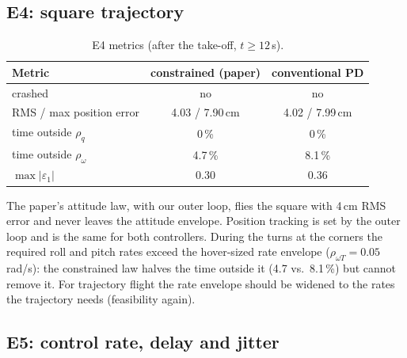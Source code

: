 \subsection{E4: square trajectory}


\begin{table}[H]
\centering\small
\caption{E4 metrics (after the take-off, $t\ge12$\,s).}
\label{tab:e4}
\begin{tabular}{@{}lcc@{}}
\toprule
\textbf{Metric} & \textbf{constrained (paper)} & \textbf{conventional PD}\\
\midrule
crashed & no & no\\
RMS / max position error & 4.03 / 7.90\,cm & 4.02 / 7.99\,cm\\
time outside $\rho_q$ & 0\,\% & 0\,\%\\
time outside $\rho_\omega$ & 4.7\,\% & 8.1\,\%\\
$\max|\varepsilon_1|$ & 0.30 & 0.36\\
\bottomrule
\end{tabular}
\end{table}

\begin{projbox}[conclusion of E4]
The paper's attitude law, with our outer loop, flies the square with 4\,cm RMS error and never leaves the attitude
envelope. Position tracking is set by the outer loop and is the same for both controllers. During the turns at the
corners the required roll and pitch rates exceed the hover-sized rate envelope ($\rho_{\omega T}=0.05$\,rad/s): the
constrained law halves the time outside it (4.7 vs.\ 8.1\,\%) but cannot remove it. For trajectory flight the rate envelope
should be widened to the rates the trajectory needs (feasibility again).
\end{projbox}

\subsection{E5: control rate, delay and jitter}


